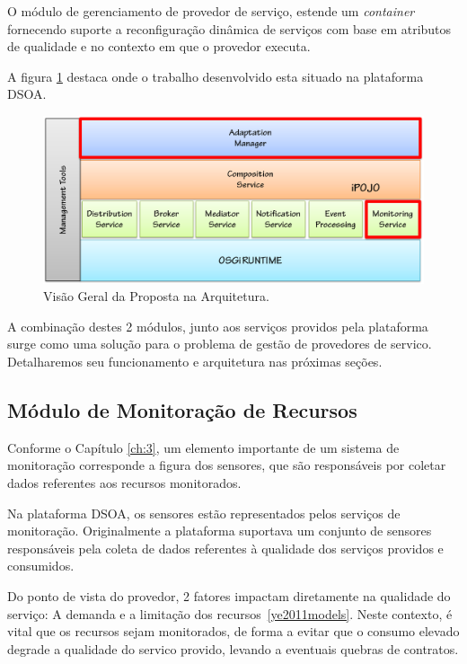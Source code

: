 O módulo de gerenciamento de provedor de serviço, estende um \textit{container} fornecendo suporte a reconfiguração dinâmica de serviços com base em atributos de qualidade e no contexto em que o provedor executa.

A figura \ref{fig:proposal} destaca onde o trabalho desenvolvido esta situado na plataforma DSOA.

\begin{figure}[htp]
\centering
\includegraphics[width=13cm]{chapters/chapter4/dsoa-provider-manager.png}
\caption[Visão Geral da Proposta na Arquitetura]{Visão Geral da Proposta na Arquitetura.}
\label{fig:proposal}
\end{figure}

A combinação destes 2 módulos, junto aos serviços providos pela plataforma surge como uma solução para o problema de gestão de provedores de servico. Detalharemos seu funcionamento e arquitetura nas próximas seções.


\subsection{Módulo de Monitoração de Recursos}

Conforme o Capítulo \ref{ch:3}, um elemento importante de um sistema de monitoração corresponde a figura dos sensores, que são responsáveis por coletar dados referentes aos recursos monitorados.

Na plataforma DSOA, os sensores estão representados pelos serviços de monitoração. Originalmente a plataforma suportava um conjunto de sensores responsáveis pela coleta de dados referentes à qualidade dos serviços providos e consumidos.

Do ponto de vista do provedor, 2 fatores impactam diretamente na qualidade do serviço: A demanda e a limitação dos recursos~\ref{ye2011models}. Neste contexto, é vital que os recursos sejam monitorados, de forma a evitar que o consumo elevado degrade a qualidade do servico provido, levando a eventuais quebras de contratos.

